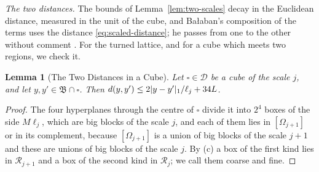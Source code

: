 \documentclass[11pt]{preprint}
\DeclarePairedDelimiter{\abs}{\lvert}{\rvert}
\numberwithin{equation}{section}
\newtheorem{lemma}[theorem]{Lemma}
\theoremstyle{definition}
\theoremstyle{remark}
\theoremstyle{plain}
\begin{document}
\emph{The two distances.} The bounds of Lemma~\ref{lem:two-scales} decay in the Euclidean distance, measured in the unit of the cube, and Ba{\l}aban's composition of the terms uses the distance \eqref{eq:scaled-distance}; he passes from one to the other without comment \cite[(2.44), (2.51)]{BalabanPRT2}. For the turned lattice, and for a cube which meets two regions, we check it.

\begin{lemma}[The Two Distances in a Cube]\label{lem:cube-distance}
Let $\square \in \mathscr D$ be a cube of the scale $j$, and let $y, y' \in \mathfrak B \cap \square$. Then $d(y, y') \leq 2\abs{y - y'}_1/\ell_j + 34L$.
\end{lemma}

\begin{proof}
The four hyperplanes through the centre of $\square$ divide it into $2^4$ boxes of the side $M\ell_j$, which are big blocks of the scale $j$, and each of them lies in $[\Omega_{j+1}]$ or in its complement, because $[\Omega_{j+1}]$ is a union of big blocks of the scale $j + 1$ and these are unions of big blocks of the scale $j$. By (c) a box of the first kind lies in $\mathcal R_{j+1}$ and a box of the second kind in $\mathcal R_j$; we call them coarse and fine.


\end{proof}
\end{document}
